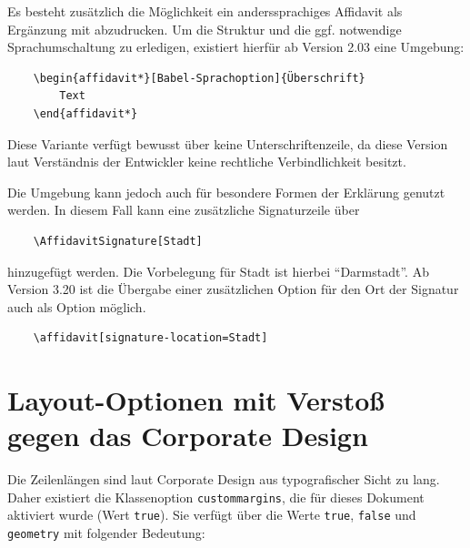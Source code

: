 \documentclass[
	ngerman,%
	accentcolor=9c,%
	ruledheaders=section,%
	class=report,%
	thesis={type=bachelor},%
	fontsize=11pt,%
	parskip=half-,%
	custommargins=true,%
	marginpar=false,%
]{tudapub}
\newcommand*{\code}[1]{\texttt{#1}}
\begin{document}
Es besteht zusätzlich die Möglichkeit ein anderssprachiges Affidavit als Ergänzung mit abzudrucken. Um die Struktur und die ggf. notwendige Sprachumschaltung zu erledigen, existiert hierfür ab Version 2.03 eine Umgebung:

\begin{verbatim}
    \begin{affidavit*}[Babel-Sprachoption]{Überschrift}
        Text
    \end{affidavit*}
\end{verbatim}

Diese Variante verfügt bewusst über keine Unterschriftenzeile, da diese Version laut Verständnis der Entwickler keine rechtliche Verbindlichkeit besitzt.

Die Umgebung kann jedoch auch für besondere Formen der Erklärung genutzt werden. In diesem Fall kann eine zusätzliche Signaturzeile über
\begin{verbatim}
    \AffidavitSignature[Stadt]
\end{verbatim}
hinzugefügt werden. Die Vorbelegung für Stadt ist hierbei \enquote{Darmstadt}.
Ab Version 3.20 ist die Übergabe einer zusätzlichen Option für den Ort der Signatur auch als Option möglich.

\begin{verbatim}
    \affidavit[signature-location=Stadt]
\end{verbatim}

\section{Layout-Optionen mit Verstoß gegen das Corporate Design}

Die Zeilenlängen sind laut Corporate Design aus typografischer Sicht zu lang.
Daher existiert die Klassenoption \code{custommargins}, die für dieses Dokument aktiviert wurde (Wert \code{true}). Sie verfügt über die Werte \code{true}, \code{false} und \code{geometry} mit folgender Bedeutung:
\end{document}

